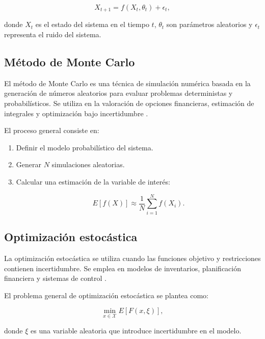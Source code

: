 \begin{itemize}
		\begin{equation}
			X_{t+1} = f(X_t, \theta_t) + \epsilon_t,
		\end{equation}
		
		donde \( X_t \) es el estado del sistema en el tiempo \( t \), \( \theta_t \) son parámetros aleatorios y \( \epsilon_t \) representa el ruido del sistema.
		
		\subsection{Método de Monte Carlo}
		
		El método de Monte Carlo es una técnica de simulación numérica basada en la generación de números aleatorios para evaluar problemas deterministas y probabilísticos. Se utiliza en la valoración de opciones financieras, estimación de integrales y optimización bajo incertidumbre \cite{metropolis1949monte}.
		
		El proceso general consiste en:
		
		\begin{enumerate}
			\item Definir el modelo probabilístico del sistema.
			\item Generar \( N \) simulaciones aleatorias.
			\item Calcular una estimación de la variable de interés:
			
			\begin{equation}
				E[f(X)] \approx \frac{1}{N} \sum_{i=1}^{N} f(X_i).
			\end{equation}
		\end{enumerate}
		
		\subsection{Optimización estocástica}
		
		La optimización estocástica se utiliza cuando las funciones objetivo y restricciones contienen incertidumbre. Se emplea en modelos de inventarios, planificación financiera y sistemas de control \cite{shapiro2009lectures}.
		
		El problema general de optimización estocástica se plantea como:
		
		\begin{equation}
			\min_{x \in \mathcal{X}} E[F(x, \xi)],
		\end{equation}
		
		donde \( \xi \) es una variable aleatoria que introduce incertidumbre en el modelo.
		

\end{itemize}
